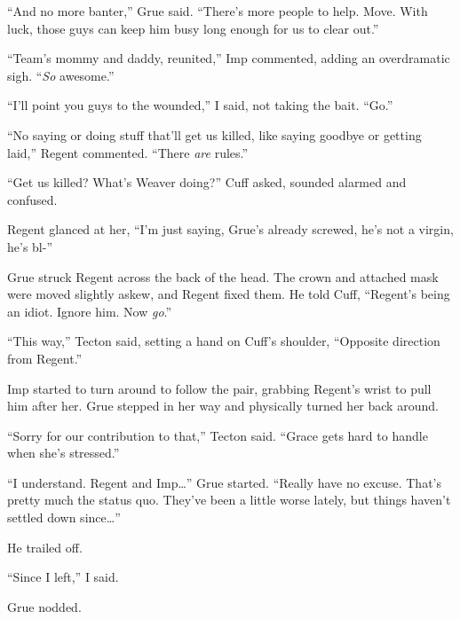``And no more banter,'' Grue said.  ``There's more people to help.  Move.  With luck, those guys can keep him busy long enough for us to clear out.''



``Team's mommy and daddy, reunited,'' Imp commented, adding an overdramatic sigh. ``\emph{So }awesome.''



``I'll point you guys to the wounded,'' I said, not taking the bait.  ``Go.''



``No saying or doing stuff that'll get us killed, like saying goodbye or getting laid,'' Regent commented.  ``There \emph{are} rules.''



``Get us killed?  What's Weaver doing?'' Cuff asked, sounded alarmed and confused.



Regent glanced at her, ``I'm just saying, Grue's already screwed, he's not a virgin, he's bl-''



Grue struck Regent across the back of the head.  The crown and attached mask were moved slightly askew, and Regent fixed them.  He told Cuff, ``Regent's being an idiot.  Ignore him.  Now \emph{go}.''



``This way,'' Tecton said, setting a hand on Cuff's shoulder, ``Opposite direction from Regent.''



Imp started to turn around to follow the pair, grabbing Regent's wrist to pull him after her.  Grue stepped in her way and physically turned her back around.



``Sorry for our contribution to that,'' Tecton said.  ``Grace gets hard to handle when she's stressed.''



``I understand.  Regent and Imp\ldots'' Grue started.  ``Really have no excuse.  That's pretty much the status quo.  They've been a little worse lately, but things haven't settled down since\ldots''



He trailed off.



``Since I left,'' I said.



Grue nodded.



